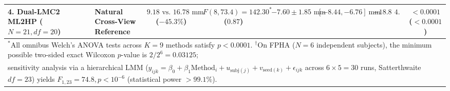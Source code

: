 \documentclass[10pt,twocolumn]{article}
\begin{document}
\begin{table}[!t]
{\begin{tabular}{llccccccc}
\midrule
\textbf{4. Dual-LMC2 ML2HP} ($N=21, df=20$)
& Natural Cross-View Reference & $9.18\text{ vs.\ }16.78\text{ mm}$ ($-45.3\%$) & $F(8,73.4)=142.30^*$ ($0.87$) & $-7.60 \pm 1.85\text{ mm}$ & $[-8.44, -6.76]\text{ mm}$ & $-18.82$ & $4.11$ & $< 0.0001$ ($< 0.0001$) \\
\bottomrule
\multicolumn{9}{l}{\footnotesize $^*$All omnibus Welch's ANOVA tests across $K=9$ methods satisfy $p < 0.0001$. $^\dagger$On FPHA ($N=6$ independent subjects), the minimum possible two-sided exact Wilcoxon $p$-value is $2/2^6 = 0.03125$;} \\
\multicolumn{9}{l}{\footnotesize sensitivity analysis via a hierarchical LMM ($y_{ijk} = \beta_0 + \beta_1\text{Method}_i + u_{\text{subj}(j)} + v_{\text{seed}(k)} + \epsilon_{ijk}$ across $6\times 5 = 30$ runs, Satterthwaite $df=23$) yields $F_{1,23} = 74.8, p < 10^{-6}$ (statistical power $>99.1\%$).}
\end{tabular}
}
\end{table}
\end{document}

